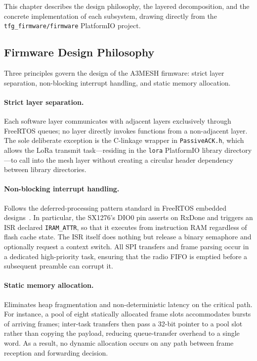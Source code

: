 \documentclass[english,bachelor]{tfgitic}[2026/01/22]
\begin{document}
This chapter describes the design philosophy, the layered decomposition, and the concrete implementation of each
subsystem, drawing directly from the \texttt{tfg\_firmware/firmware} PlatformIO
project.


\subsection{Firmware Design Philosophy}
\label{sec:fw_philosophy}

Three principles govern the design of the A3MESH firmware: strict layer separation,
non-blocking interrupt handling, and static memory allocation.

\paragraph{Strict layer separation.} Each software layer communicates with
adjacent layers exclusively through FreeRTOS queues; no layer directly invokes
functions from a non-adjacent layer. The sole deliberate exception is the C-linkage
wrapper in \texttt{PassiveACK.h}, which allows the LoRa transmit task---residing in
the \texttt{lora} PlatformIO library directory---to call into the mesh layer without
creating a circular header dependency between library directories.

\paragraph{Non-blocking interrupt handling.} Follows the deferred-processing pattern
standard in FreeRTOS embedded designs~\cite{freertos2024}. In particular, the SX1276's DIO0 pin
asserts on RxDone and triggers an ISR declared \texttt{IRAM\_ATTR}, so that it
executes from instruction RAM regardless of flash cache state. The ISR itself does nothing but
release a binary semaphore and optionally request a context switch. All SPI transfers
and frame parsing occur in a dedicated high-priority task, ensuring that the radio
FIFO is emptied before a subsequent preamble can corrupt it.

\paragraph{Static memory allocation.} Eliminates heap fragmentation and non-deterministic
latency on the critical path. For instance, a pool of eight statically allocated frame slots
accommodates bursts of arriving frames; inter-task transfers then pass a 32-bit pointer to
a pool slot rather than copying the payload, reducing queue-transfer overhead to a
single word. As a result, no dynamic allocation occurs on any path between frame reception and
forwarding decision.
\end{document}
